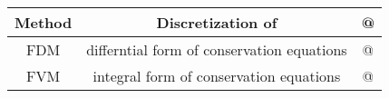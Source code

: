 
\begin{tabular}{|c|c|c|}
\hline
	Method & Discretization of & @\\
\hline
	FDM & differntial form of conservation equations & @\\
\hline
	FVM & integral form of conservation equations & @\\
\hline
\end{tabular}




